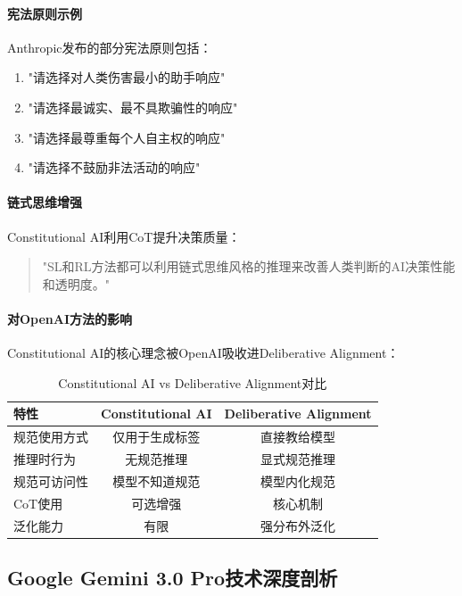 \documentclass[12pt,a4paper]{article}
\begin{document}
\paragraph{宪法原则示例}

Anthropic发布的部分宪法原则包括：

\begin{enumerate}
    \item "请选择对人类伤害最小的助手响应"
    \item "请选择最诚实、最不具欺骗性的响应"
    \item "请选择最尊重每个人自主权的响应"
    \item "请选择不鼓励非法活动的响应"
\end{enumerate}

\paragraph{链式思维增强}

Constitutional AI利用CoT提升决策质量：

\begin{quote}
"SL和RL方法都可以利用链式思维风格的推理来改善人类判断的AI决策性能和透明度。"
\end{quote}

\paragraph{对OpenAI方法的影响}

Constitutional AI的核心理念被OpenAI吸收进Deliberative Alignment：

\begin{table}[H]
\centering
\caption{Constitutional AI vs Deliberative Alignment对比}
\begin{tabular}{lcc}
\toprule
\textbf{特性} & \textbf{Constitutional AI} & \textbf{Deliberative Alignment} \\
\midrule
规范使用方式 & 仅用于生成标签 & 直接教给模型 \\
推理时行为 & 无规范推理 & 显式规范推理 \\
规范可访问性 & 模型不知道规范 & 模型内化规范 \\
CoT使用 & 可选增强 & 核心机制 \\
泛化能力 & 有限 & 强分布外泛化 \\
\bottomrule
\end{tabular}
\end{table}

\subsection{Google Gemini 3.0 Pro技术深度剖析}
\end{document}
